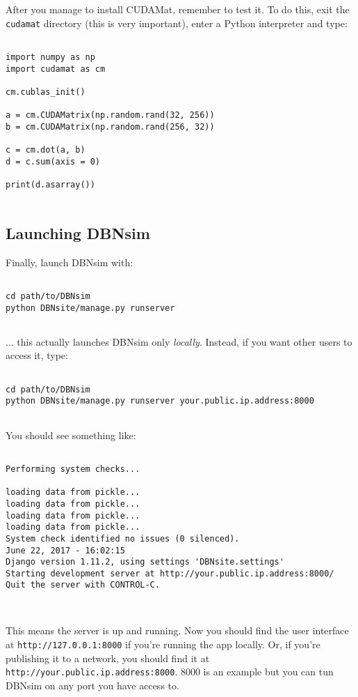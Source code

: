 \documentclass[a4paper]{article}
\begin{document}
		
After you manage to install CUDAMat, remember to test it. To do this, exit the \texttt{cudamat} directory (this is very important), enter a Python interpreter and type:
		\begin{verbatim}

import numpy as np
import cudamat as cm

cm.cublas_init()

a = cm.CUDAMatrix(np.random.rand(32, 256))
b = cm.CUDAMatrix(np.random.rand(256, 32))

c = cm.dot(a, b)
d = c.sum(axis = 0)

print(d.asarray())
		
\end{verbatim}


		
	\subsection{Launching DBNsim}

		
Finally, launch DBNsim with:
		\begin{verbatim}

cd path/to/DBNsim
python DBNsite/manage.py runserver
		
\end{verbatim}

		
... this actually launches DBNsim only \emph{locally}. Instead, if you want other users to access it, type:
		\begin{verbatim}

cd path/to/DBNsim
python DBNsite/manage.py runserver your.public.ip.address:8000
		
\end{verbatim}

		
You should see something like:
		\begin{verbatim}

Performing system checks...

loading data from pickle...
loading data from pickle...
loading data from pickle...
loading data from pickle...
System check identified no issues (0 silenced).
June 22, 2017 - 16:02:15
Django version 1.11.2, using settings 'DBNsite.settings'
Starting development server at http://your.public.ip.address:8000/
Quit the server with CONTROL-C.

		
\end{verbatim}

		
This means the server is up and running. Now you should find the user interface at \texttt{http://127.0.0.1:8000} if you're running the app locally. Or, if you're publishing it to a network, you should find it at \texttt{http://your.public.ip.address:8000}. 8000 is an example but you can tun DBNsim on any port you have access to.
		
\end{document}
